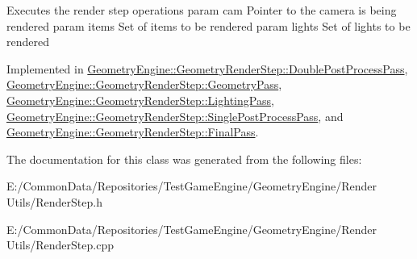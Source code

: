 Executes the render step operations param cam Pointer to the camera is being rendered param items Set of items to be rendered param lights Set of lights to be rendered 

Implemented in \mbox{\hyperlink{class_geometry_engine_1_1_geometry_render_step_1_1_double_post_process_pass_a45e346852e7c86c257af98f85ddba9f9}{Geometry\+Engine\+::\+Geometry\+Render\+Step\+::\+Double\+Post\+Process\+Pass}}, \mbox{\hyperlink{class_geometry_engine_1_1_geometry_render_step_1_1_geometry_pass_ac3bfd0a3915cd8a8cd7e1bf81157f6ad}{Geometry\+Engine\+::\+Geometry\+Render\+Step\+::\+Geometry\+Pass}}, \mbox{\hyperlink{class_geometry_engine_1_1_geometry_render_step_1_1_lighting_pass_ae6d9fa99f67e659839ca310947787f52}{Geometry\+Engine\+::\+Geometry\+Render\+Step\+::\+Lighting\+Pass}}, \mbox{\hyperlink{class_geometry_engine_1_1_geometry_render_step_1_1_single_post_process_pass_abb6e6e69af639e0c1bd8b1ec7c73a44c}{Geometry\+Engine\+::\+Geometry\+Render\+Step\+::\+Single\+Post\+Process\+Pass}}, and \mbox{\hyperlink{class_geometry_engine_1_1_geometry_render_step_1_1_final_pass_ad078d0e9d394754dbbd3cff871d72b9f}{Geometry\+Engine\+::\+Geometry\+Render\+Step\+::\+Final\+Pass}}.



The documentation for this class was generated from the following files\+:\begin{DoxyCompactItemize}
\item 
E\+:/\+Common\+Data/\+Repositories/\+Test\+Game\+Engine/\+Geometry\+Engine/\+Render Utils/Render\+Step.\+h\item 
E\+:/\+Common\+Data/\+Repositories/\+Test\+Game\+Engine/\+Geometry\+Engine/\+Render Utils/Render\+Step.\+cpp\end{DoxyCompactItemize}
